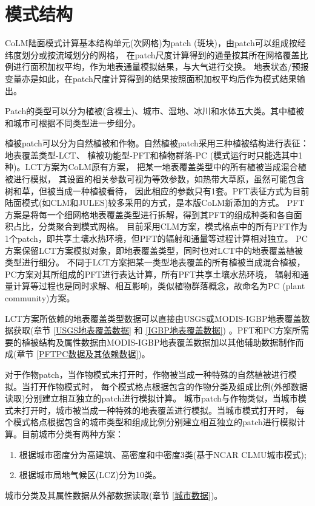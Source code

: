 \chapter{模式结构}\label{模式结构}

CoLM陆面模式计算基本结构单元(次网格)为patch (斑块)，由patch可以组成按经纬度划分或按流域划分的网格，
在patch尺度计算得到的通量按其所在网格覆盖比例进行面积加权平均，作为地表通量模拟结果，与大气进行交换。
地表状态/预报变量亦是如此，在patch尺度计算得到的结果按照面积加权平均后作为模式结果输出。


Patch的类型可以分为植被(含裸土)、城市、湿地、冰川和水体五大类。其中植被和城市可根据不同类型进一步细分。


植被patch可以分为自然植被和作物。自然植被patch采用三种植被结构进行表征：地表覆盖类型-LCT、
植被功能型-PFT和植物群落-PC (模式运行时只能选其中1种)。LCT方案为CoLM原有方案，
把某一地表覆盖类型中的所有植被当成混合植被进行模拟，
其设置的相关参数可视为等效参数，如热带大草原，虽然可能包含树和草，但被当成一种植被看待，
因此相应的参数只有1套。PFT表征方式为目前陆面模式(如CLM和JULES)较多采用的方式，是本版CoLM新添加的方式。
PFT方案是将每一个细网格地表覆盖类型进行拆解，得到其PFT的组成种类和各自面积占比，分类聚合到模式网格。
目前采用CLM方案，模式格点中的所有PFT作为1个patch，即共享土壤水热环境，但PFT的辐射和通量等过程计算相对独立。
PC方案保留LCT方案模拟对象，即地表覆盖类型，同时也对LCT中的地表覆盖植被类型进行细分。
不同于LCT方案把某一类型地表覆盖的所有植被当成混合植被，PC方案对其所组成的PFT进行表达计算，所有PFT共享土壤水热环境，
辐射和通量计算等过程也是同时求解、相互影响，类似植物群落概念，故命名为PC (plant community)方案。


LCT方案所依赖的地表覆盖类型数据可以直接由USGS或MODIS-IGBP地表覆盖数据获取(章节 \ref{USGS地表覆盖数据} 和 \ref{IGBP地表覆盖数据}) 
。PFT和PC方案所需要的植被结构及属性数据由MODIS-IGBP地表覆盖数据加以其他辅助数据制作而成(章节 \ref{PFTPC数据及其依赖数据})。


对于作物patch，当作物模式未打开时，作物被当成一种特殊的自然植被进行模拟。当打开作物模式时，
每个模式格点根据包含的作物分类及组成比例(外部数据读取)分别建立相互独立的patch进行模拟计算。
城市patch与作物类似，当城市模式未打开时，城市被当成一种特殊的地表覆盖进行模拟。当城市模式打开时，
每个模式格点根据包含的城市类型和组成比例分别建立相互独立的patch进行模拟计算。目前城市分类有两种方案：
\begin{enumerate}
    \item 根据城市密度分为高建筑、高密度和中密度3类(基于NCAR CLMU城市模式);
    \item 根据城市局地气候区(LCZ)分为10类。
\end{enumerate}
城市分类及其属性数据从外部数据读取(章节 \ref{城市数据})。


